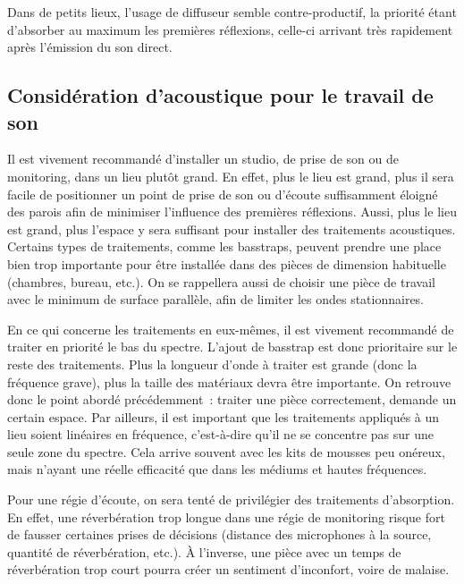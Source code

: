 \documentclass[
]{book}
\begin{document}
Dans de petits lieux, l'usage de diffuseur semble contre-productif, la priorité étant d'absorber au maximum les premières réflexions, celle-ci arrivant très rapidement après l'émission du son direct.

\hypertarget{considuxe9ration-dacoustique-pour-le-travail-de-son}{%
\subsection{Considération d'acoustique pour le travail de son}\label{considuxe9ration-dacoustique-pour-le-travail-de-son}}

Il est vivement recommandé d'installer un studio, de prise de son ou de monitoring, dans un lieu plutôt grand. En effet, plus le lieu est grand, plus il sera facile de positionner un point de prise de son ou d'écoute suffisamment éloigné des parois afin de minimiser l'influence des premières réflexions. Aussi, plus le lieu est grand, plus l'espace y sera suffisant pour installer des traitements acoustiques. Certains types de traitements, comme les basstraps, peuvent prendre une place bien trop importante pour être installée dans des pièces de dimension habituelle (chambres, bureau, etc.). On se rappellera aussi de choisir une pièce de travail avec le minimum de surface parallèle, afin de limiter les ondes stationnaires.

En ce qui concerne les traitements en eux-mêmes, il est vivement recommandé de traiter en priorité le bas du spectre. L'ajout de basstrap est donc prioritaire sur le reste des traitements. Plus la longueur d'onde à traiter est grande (donc la fréquence grave), plus la taille des matériaux devra être importante. On retrouve donc le point abordé précédemment~: traiter une pièce correctement, demande un certain espace. Par ailleurs, il est important que les traitements appliqués à un lieu soient linéaires en fréquence, c'est-à-dire qu'il ne se concentre pas sur une seule zone du spectre. Cela arrive souvent avec les kits de mousses peu onéreux, mais n'ayant une réelle efficacité que dans les médiums et hautes fréquences.

Pour une régie d'écoute, on sera tenté de privilégier des traitements d'absorption. En effet, une réverbération trop longue dans une régie de monitoring risque fort de fausser certaines prises de décisions (distance des microphones à la source, quantité de réverbération, etc.). À l'inverse, une pièce avec un temps de réverbération trop court pourra créer un sentiment d'inconfort, voire de malaise.
\end{document}
